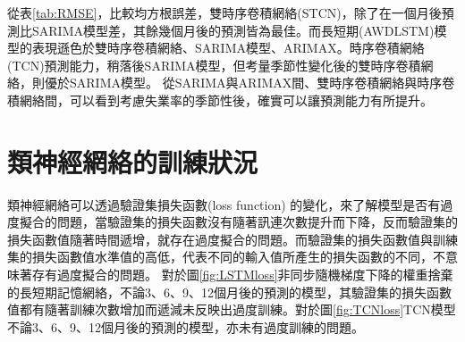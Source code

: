 \documentclass[oneside]{book}
\begin{document}
從表\ref{tab:RMSE}，比較均方根誤差，雙時序卷積網絡(STCN)，除了在一個月後預測比SARIMA模型差，其餘幾個月後的預測皆為最佳。而長短期(AWDLSTM)模型的表現遜色於雙時序卷積網絡、SARIMA模型、ARIMAX。時序卷積網絡(TCN)預測能力，稍落後SARIMA模型，但考量季節性變化後的雙時序卷積網絡，則優於SARIMA模型。
從SARIMA與ARIMAX間、雙時序卷積網絡與時序卷積網絡間，可以看到考慮失業率的季節性後，確實可以讓預測能力有所提升。

\hypertarget{ux985eux795eux7d93ux7db2ux7d61ux7684ux8a13ux7df4ux72c0ux6cc1}{%
\section{類神經網絡的訓練狀況}\label{ux985eux795eux7d93ux7db2ux7d61ux7684ux8a13ux7df4ux72c0ux6cc1}}

類神經網絡可以透過驗證集損失函數(loss function) 的變化，來了解模型是否有過度擬合的問題，當驗證集的損失函數沒有隨著訊連次數提升而下降，反而驗證集的損失函數值隨著時間遞增，就存在過度擬合的問題。而驗證集的損失函數值與訓練集的損失函數值水準值的高低，代表不同的輸入值所產生的損失函數的不同，不意味著存有過度擬合的問題。
對於圖\ref{fig:LSTMloss}非同步隨機梯度下降的權重捨棄的長短期記憶網絡，不論3、6、9、12個月後的預測的模型，其驗證集的損失函數值都有隨著訓練次數增加而遞減未反映出過度訓練。對於圖\ref{fig:TCNloss}TCN模型不論3、6、9、12個月後的預測的模型，亦未有過度訓練的問題。
\end{document}
